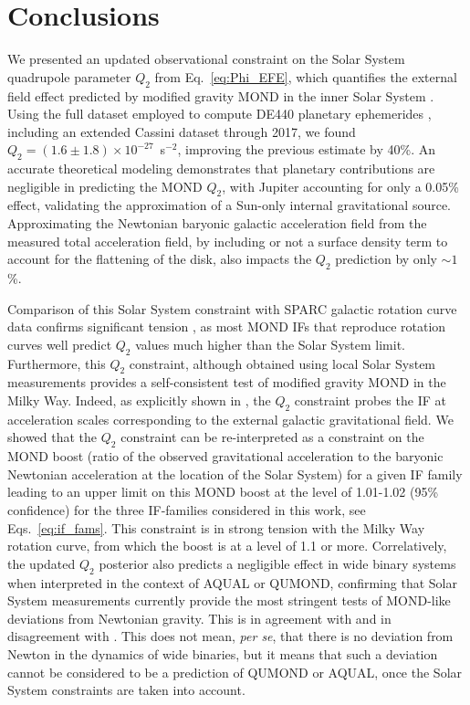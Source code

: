 \documentclass[reprint,nofootinbib,prd,aps]{revtex4-2}
\begin{document}
\section{Conclusions}
We presented an updated observational constraint on the Solar System quadrupole parameter $Q_2$ from Eq.~\eqref{eq:Phi_EFE}, which quantifies the external field effect predicted by modified gravity MOND in the inner Solar System \cite{milgrom:2009vn}. Using the full dataset employed to compute DE440 planetary ephemerides \cite{park_2021}, including an extended Cassini dataset through 2017, we found $Q_2 = (1.6 \pm 1.8) \times 10^{-27}$~s$^{-2}$, improving the previous estimate by 40\%. An accurate theoretical modeling demonstrates that planetary contributions are negligible in predicting the MOND $Q_2$, with Jupiter accounting for only a 0.05\% effect, validating the approximation of a Sun-only internal gravitational source. Approximating the Newtonian baryonic galactic acceleration field from the measured total acceleration field, by including or not a surface density term to account for the flattening of the disk, also impacts the $Q_2$ prediction by only $\sim 1$ \%. 

Comparison of this Solar System constraint with SPARC galactic rotation curve data \cite{lelli:2016} confirms significant tension \cite{Desmond_Cassini}, as most MOND IFs that reproduce rotation curves well predict $Q_2$ values much higher than the Solar System limit. Furthermore, this $Q_2$ constraint, although obtained using local Solar System measurements provides a self-consistent test of modified gravity MOND in the Milky Way. Indeed, as explicitly shown in \cite{Desmond_Cassini}, the $Q_2$ constraint probes the IF at acceleration scales corresponding to the external galactic gravitational field. We showed that the $Q_2$ constraint can be re-interpreted as a constraint on the MOND boost (ratio of the observed gravitational acceleration to the baryonic Newtonian acceleration at the location of the Solar System) for a given IF family leading to an upper limit on this MOND boost at the level of 1.01-1.02 (95\% confidence) for the three IF-families considered in this work, see Eqs.~\eqref{eq:if_fams}. This constraint is in strong tension with the Milky Way rotation curve, from which the boost is at a level of 1.1 or more. Correlatively, the updated $Q_2$ posterior also predicts a negligible effect in wide binary systems when interpreted in the context of AQUAL or QUMOND, confirming that Solar System measurements currently provide the most stringent tests of MOND-like deviations from Newtonian gravity. This is in agreement with \cite{Banik_WBT} and in disagreement with \cite{Hernandez,*Hernandez_2,*Hernandez_4,*Hernandez_Chae}. This does not mean, {\it per se}, that there is no deviation from Newton in the dynamics of wide binaries, but it means that such a deviation cannot be considered to be a prediction of QUMOND or AQUAL, once the Solar System constraints are taken into account. 
\end{document}
